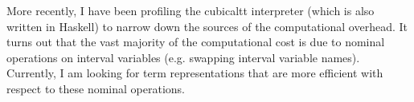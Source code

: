 \documentclass[12pt]{article}
\theoremstyle{plain} \numberwithin{equation}{section}
\theoremstyle{definition}
\begin{document}
More recently, I have been profiling the cubicaltt interpreter (which is also written in Haskell) to narrow down the sources of the computational overhead. It turns out that the vast majority of the computational cost is due to nominal operations on interval variables (e.g. swapping interval variable names). Currently, I am looking for term representations that are more efficient with respect to these nominal operations.




\end{document}
